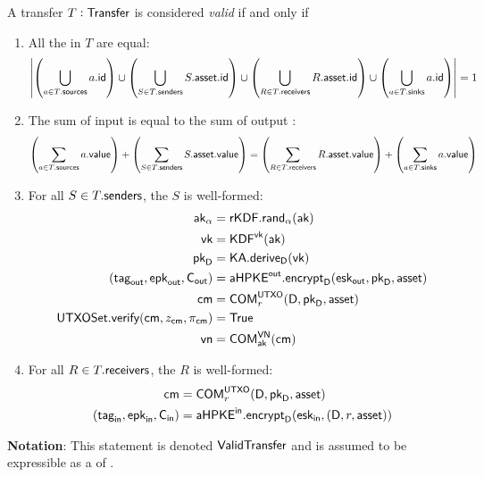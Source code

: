 \begin{definition}\label{def:transfer-validity-statement}
    A transfer $T : {\textsf{Transfer}}$ is considered \emph{valid} if and only if
    \begin{enumerate}
        \item All the  in $T$ are equal:
            \[
                \left|
                    \left(\bigcup_{a \in T.{\textsf{sources}}} a.{\textsf{id}} \right)
                    \cup
                    \left(\bigcup_{S \in T.{\textsf{senders}}} S.{\textsf{asset}}.{\textsf{id}} \right)
                    \cup
                    \left(\bigcup_{R \in T.{\textsf{receivers}}} R.{\textsf{asset}}.{\textsf{id}} \right)
                    \cup
                    \left(\bigcup_{a \in T.{\textsf{sinks}}} a.{\textsf{id}} \right)
                \right| = 1
            \]
        \item The sum of input  is equal to the sum of output :
            \[
                \left(\sum_{a \in T.{\textsf{sources}}} a.{\textsf{value}}\right)
                +
                \left(\sum_{S \in T.{\textsf{senders}}} S.{\textsf{asset}}.{\textsf{value}}\right)
                =
                \left(\sum_{R \in T.{\textsf{receivers}}} R.{\textsf{asset}}.{\textsf{value}}\right)
                +
                \left(\sum_{a \in T.{\textsf{sinks}}} a.{\textsf{value}}\right)
            \]
        \item For all $S \in T.{\textsf{senders}}$, the \Sender{} $S$ is well-formed:
            \begin{align*}
                {\textsf{ak}}_\alpha                            &= {\textsf{rKDF}}.{\textsf{rand}}_\alpha({\textsf{ak}}) \\
                {\textsf{vk}}                                   &= {\textsf{KDF}}^{\textsf{vk}}({\textsf{ak}}) \\
                {{\textsf{pk}}_\textsf{D}}                                  &= {\textsf{KA}}.{\textsf{derive}}_\textsf{D}({\textsf{vk}}) \\
                ({{\textsf{tag}}_{\textsf{out}}}, {{\textsf{epk}}_{\textsf{out}}}, {\textsf{C}_\textsf{out}})             &= {{\textsf{aHPKE}}^\textsf{out}}.{\textsf{encrypt}}_\textsf{D}({{\textsf{esk}}_{\textsf{out}}}, {{\textsf{pk}}_\textsf{D}}, {\textsf{asset}}) \\
                {\textsf{cm}}                                   &= {\textsf{COM}}^{{\textsf{UTXO}}}_{r}(\textsf{D}, {{\textsf{pk}}_\textsf{D}}, {\textsf{asset}}) \\
                {\textsf{UTXOSet}}.{\textsf{verify}}({\textsf{cm}}, z_{\textsf{cm}}, \pi_{\textsf{cm}}) &= {\textsf{True}} \\
                {\textsf{vn}}                                   &= {\textsf{COM}}^{{\textsf{VN}}}_{{\textsf{ak}}}({\textsf{cm}})
            \end{align*}
        \item For all $R \in T.{\textsf{receivers}}$, the \Receiver{} $R$ is well-formed:
            \begin{align*}
                {\textsf{cm}}            &= {\textsf{COM}}^{{\textsf{UTXO}}}_{r}(\textsf{D}, {{\textsf{pk}}_\textsf{D}}, {\textsf{asset}}) \\
                ({{\textsf{tag}}_\textsf{in}}, {{\textsf{epk}}_\textsf{in}}, {\textsf{C}_\textsf{in}}) &= {{\textsf{aHPKE}}^\textsf{in}}.{\textsf{encrypt}}_\textsf{D}({{\textsf{esk}}_\textsf{in}}, (\textsf{D}, r, {\textsf{asset}}))
            \end{align*}
    \end{enumerate}
    \textbf{Notation}: This statement is denoted ${\textsf{ValidTransfer}}$ and is assumed to be expressible as a \Statement{} of \NIZK{}.
\end{definition}

